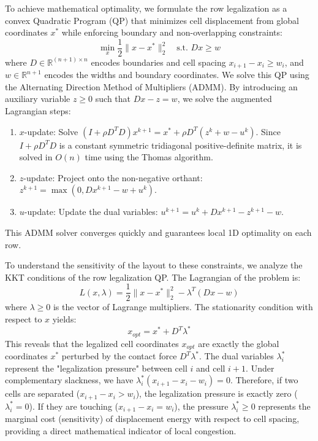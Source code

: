 \documentclass[10pt, twocolumn]{article}
\begin{document}
To achieve mathematical optimality, we formulate the row legalization as a convex Quadratic Program (QP) that minimizes cell displacement from global coordinates $x^*$ while enforcing boundary and non-overlapping constraints:
\begin{equation}
\min_{x} \frac{1}{2} \|x - x^*\|_2^2 \quad \text{s.t. } D x \ge w
\end{equation}
where $D \in \mathbb{R}^{(n+1) \times n}$ encodes boundaries and cell spacing $x_{i+1} - x_i \ge w_i$, and $w \in \mathbb{R}^{n+1}$ encodes the widths and boundary coordinates. We solve this QP using the Alternating Direction Method of Multipliers (ADMM). By introducing an auxiliary variable $z \ge 0$ such that $D x - z = w$, we solve the augmented Lagrangian steps:
\begin{enumerate}
\item $x$-update: Solve $(I + \rho D^T D) x^{k+1} = x^* + \rho D^T(z^k + w - u^k)$. Since $I + \rho D^T D$ is a constant symmetric tridiagonal positive-definite matrix, it is solved in $O(n)$ time using the Thomas algorithm.
\item $z$-update: Project onto the non-negative orthant: $z^{k+1} = \max(0, D x^{k+1} - w + u^k)$.
\item $u$-update: Update the dual variables: $u^{k+1} = u^k + D x^{k+1} - z^{k+1} - w$.
\end{enumerate}
This ADMM solver converges quickly and guarantees local 1D optimality on each row.

To understand the sensitivity of the layout to these constraints, we analyze the KKT conditions of the row legalization QP. The Lagrangian of the problem is:
\begin{equation}
L(x, \lambda) = \frac{1}{2} \|x - x^*\|_2^2 - \lambda^T (D x - w)
\end{equation}
where $\lambda \ge 0$ is the vector of Lagrange multipliers. The stationarity condition with respect to $x$ yields:
\begin{equation}
x_{opt} = x^* + D^T \lambda^*
\end{equation}
This reveals that the legalized cell coordinates $x_{opt}$ are exactly the global coordinates $x^*$ perturbed by the contact force $D^T \lambda^*$. The dual variables $\lambda_i^*$ represent the "legalization pressure" between cell $i$ and cell $i+1$. Under complementary slackness, we have $\lambda_i^* (x_{i+1} - x_i - w_i) = 0$. Therefore, if two cells are separated ($x_{i+1} - x_i > w_i$), the legalization pressure is exactly zero ($\lambda_i^* = 0$). If they are touching ($x_{i+1} - x_i = w_i$), the pressure $\lambda_i^* \ge 0$ represents the marginal cost (sensitivity) of displacement energy with respect to cell spacing, providing a direct mathematical indicator of local congestion.
\end{document}
